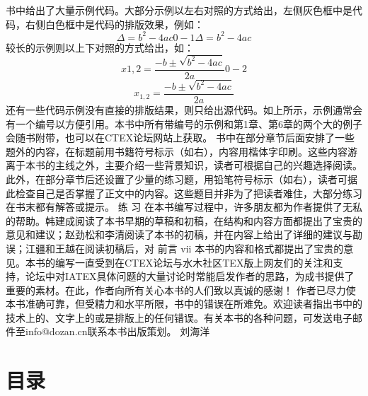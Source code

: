 \documentclass[UTF8]{ctexart}
\begin{document}
书中给出了大量示例代码。大部分示例以左右对照的方式给出，左侧灰色框中是代码，右侧白色框中是代码的排版效果，例如：
\[
  \Delta = b^{2} - 4 a c0-1	 \Delta = b^2-4ac
\]
较长的示例则以上下对照的方式给出，如：
\[
x {1,2} = \frac{-b \pm \sqrt{b^2-4ac}}{2a}
0-2	\]
\[
  x_{1 , 2} = \frac{ - b \pm \sqrt{b^{2} - 4 a c}}{2 a}
\]
还有一些代码示例没有直接的排版结果，则只给出源代码。如上所示，示例通常会有一个编号以方便引用。本书中所有带编号的示例和第1章、第6章的两个大的例子会随书附带，也可以在CTEX论坛网站上获取。
书中在部分章节后面安排了一些题外的内容，在标题前用书籍符号标示（如右），内容用楷体字印刷。这些内容游离于本书的主线之外，主要介绍一些背景知识，读者可根据自己的兴趣选择阅读。
此外，在部分章节后还设置了少量的练习题，用铅笔符号标示（如右），读者可据此检查自己是否掌握了正文中的内容。这些题目并非为了把读者难住，大部分练习在书末都有解答或提示。
练	习
在本书编写过程中，许多朋友都为作者提供了无私的帮助。韩建成阅读了本书早期的草稿和初稿，在结构和内容方面都提出了宝贵的意见和建议；赵劲松和李清阅读了本书的初稿，并在内容上给出了详细的建议与勘误；江疆和王越在阅读初稿后，对
前言	vii
本书的内容和格式都提出了宝贵的意见。本书的编写一直受到在CTEX论坛与水木社区TEX版上网友们的关注和支持，论坛中对IATEX具体问题的大量讨论时常能启发作者的思路，为成书提供了重要的素材。在此，作者向所有关心本书的人们致以真诚的感谢！
作者已尽力使本书准确可靠，但受精力和水平所限，书中的错误在所难免。欢迎读者指出书中的技术上的、文字上的或是排版上的任何错误。有关本书的各种问题，可发送电子邮件至info@dozan.cn联系本书出版策划。
刘海洋

\section{目录}%
\label{sec:目录}
\end{document}
